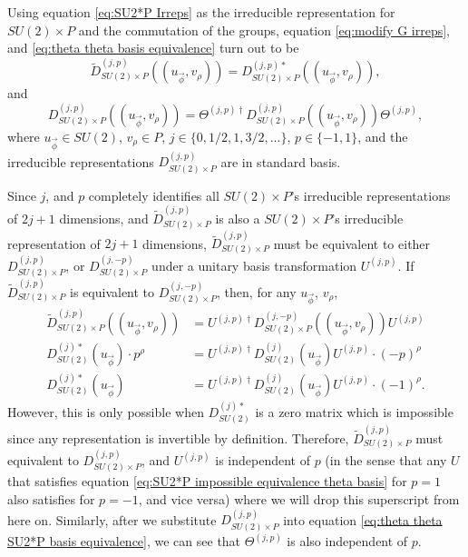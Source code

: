 \documentclass[preprint, 12pt]{revtex4-2}
\numberwithin{equation}{section}
\begin{document}
Using equation \ref{eq:SU2*P Irreps} as the irreducible representation for $SU(2)\times P$ and the commutation of the groups, equation \ref{eq:modify G irreps}, and \ref{eq:theta theta basis equivalence} turn out to be
\begin{equation}\label{eq:modify SU2*P irreps}
    \tilde{D}_{SU(2)\times P}^{(j,p)}((u_{\vec{\phi}}, v_\rho)) = D_{SU(2)\times P}^{(j,p)\ast}((u_{\vec{\phi}}, v_\rho)),
\end{equation}
and
\begin{equation}\label{eq:theta theta SU2*P basis equivalence}
   D_{SU(2)\times P}^{(j,p)}((u_{\vec{\phi}}, v_\rho)) = \Theta^{(j,p)\dagger} D_{SU(2)\times P}^{(j,p)}((u_{\vec{\phi}}, v_\rho))\Theta^{(j,p)},
\end{equation}
where $u_{\vec{\phi}}\in SU(2)$, $v_\rho\in P$, $j\in \{0, 1/2, 1, 3/2, ...\}$, $p\in\{-1, 1\}$, and the irreducible representations $D_{SU(2)\times P}^{(j,p)}$ are in standard basis.

Since $j$, and $p$ completely identifies all $SU(2)\times P$'s irreducible representations of $2j+1$ dimensions, and $\tilde{D}_{SU(2)\times P}^{(j,p)}$ is also a $SU(2)\times P$'s irreducible representation of $2j+1$ dimensions, $\tilde{D}_{SU(2)\times P}^{(j,p)}$ must be equivalent to either $D_{SU(2)\times P}^{(j,p)}$, or $D_{SU(2)\times P}^{(j,-p)}$ under a unitary basis transformation $U^{(j, p)}$. If $\tilde{D}_{SU(2)\times P}^{(j,p)}$ is equivalent to $D_{SU(2)\times P}^{(j,-p)}$, then, for any $u_{\vec{\phi}}$, $v_\rho$,
\begin{equation}\label{eq:SU2*P impossible equivalence theta basis}
    \begin{aligned}
        \tilde{D}_{SU(2)\times P}^{(j,p)}((u_{\vec{\phi}}, v_\rho)) &= U^{(j,p)\dagger}D_{SU(2)\times P}^{(j,-p)}((u_{\vec{\phi}}, v_\rho))U^{(j,p)} \\
        D^{(j)\ast}_{SU(2)}(u_{\vec{\phi}})\cdot p^\rho &= U^{(j,p)\dagger}D^{(j)}_{SU(2)}(u_{\vec{\phi}})U^{(j,p)}\cdot (-p)^\rho \\
        D^{(j)\ast}_{SU(2)}(u_{\vec{\phi}}) &= U^{(j,p)\dagger}D^{(j)}_{SU(2)}(u_{\vec{\phi}})U^{(j,p)}\cdot (-1)^\rho.
    \end{aligned}
\end{equation}
However, this is only possible when $D^{(j)\ast}_{SU(2)}$ is a zero matrix which is impossible since any representation is invertible by definition. Therefore, $\tilde{D}_{SU(2)\times P}^{(j,p)}$ must equivalent to $D_{SU(2)\times P}^{(j,p)}$, and $U^{(j,p)}$ is independent of $p$ (in the sense that any $U$ that satisfies equation \ref{eq:SU2*P impossible equivalence theta basis} for $p=1$ also satisfies for $p=-1$, and vice versa) where we will drop this superscript from here on. Similarly, after we substitute $D_{SU(2)\times P}^{(j,p)}$ into equation \ref{eq:theta theta SU2*P basis equivalence}, we can see that $\Theta^{(j,p)}$ is also independent of $p$. 
\end{document}

